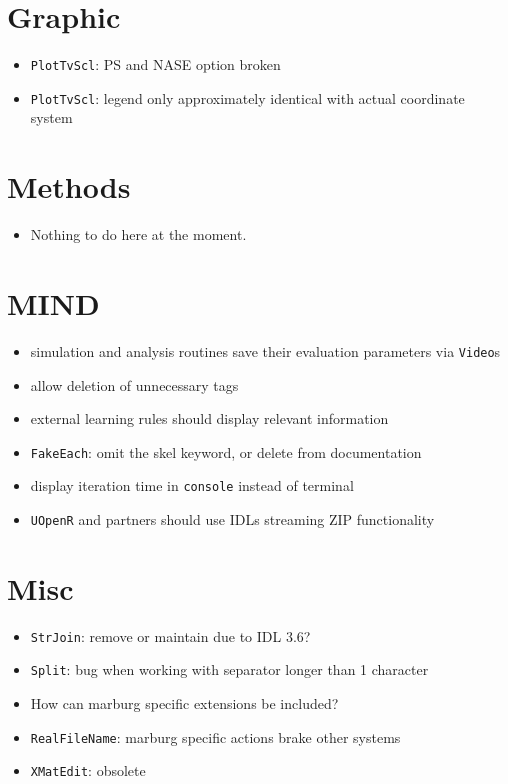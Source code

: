 \documentclass[12pt]{article}
\begin{document}
\section{Graphic}
\begin{itemize}
\item \texttt{PlotTvScl}: PS and NASE option broken
\item \texttt{PlotTvScl}: legend only approximately identical with actual coordinate system
\end{itemize}


\section{Methods}
\begin{itemize}
\item Nothing to do here at the moment.
\end{itemize}


\section{MIND}
\begin{itemize}
\item simulation and analysis routines save their evaluation parameters via \texttt{Video}s
\item allow deletion of unnecessary tags
\item external learning rules should display relevant information
\item \texttt{FakeEach}: omit the skel keyword, or delete from documentation
\item display iteration time in \texttt{console} instead of terminal
\item \texttt{UOpenR} and partners should use IDLs streaming ZIP functionality
\end{itemize}



\section{Misc}
\begin{itemize}
\item \texttt{StrJoin}: remove or maintain due to IDL 3.6?
\item \texttt{Split}: bug when working with separator longer than 1 character
\item How can marburg specific extensions be included?
\item \texttt{RealFileName}: marburg specific actions brake other systems
\item \texttt{XMatEdit}: obsolete 
\end{itemize}
\end{document}
